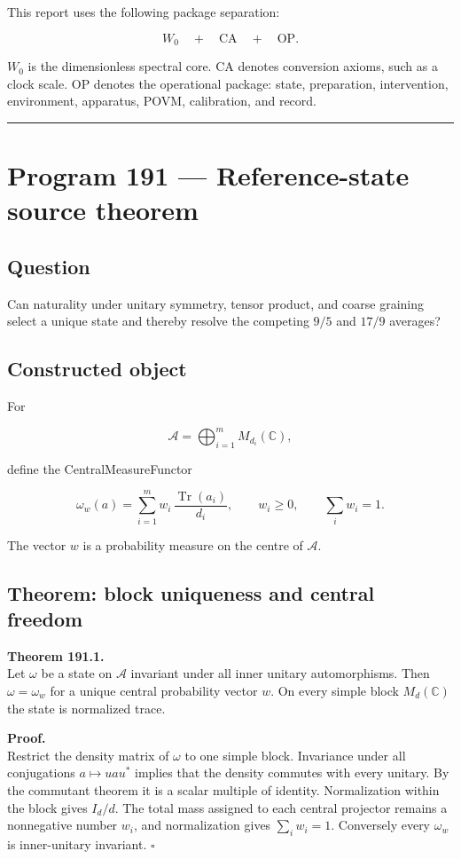 \documentclass[11pt,a4paper,openany]{report}
\begin{document}
This report uses the following package separation:

\[
W_0
\quad+\quad
\mathrm{CA}
\quad+\quad
\mathrm{OP}.
\]

\(W_0\) is the dimensionless spectral core. CA denotes conversion axioms, such as a clock scale. OP denotes the operational package: state, preparation, intervention, environment, apparatus, POVM, calibration, and record.

\par\medskip\hrule\medskip

\chapter{Program 191 --- Reference-state source theorem}

\section{Question}

Can naturality under unitary symmetry, tensor product, and coarse graining select a unique state and thereby resolve the competing \(9/5\) and \(17/9\) averages?

\section{Constructed object}

For

\[
\mathcal A=\bigoplus_{i=1}^m M_{d_i}(\mathbb C),
\]

define the CentralMeasureFunctor

\[
\omega_w(a)
=
\sum_{i=1}^m
w_i\,\frac{\operatorname{Tr}(a_i)}{d_i},
\qquad
w_i\ge0,
\qquad
\sum_iw_i=1.
\]

The vector \(w\) is a probability measure on the centre of \(\mathcal A\).

\section{Theorem: block uniqueness and central freedom}

\textbf{Theorem 191.1.}\\
Let \(\omega\) be a state on \(\mathcal A\) invariant under all inner unitary automorphisms. Then \(\omega=\omega_w\) for a unique central probability vector \(w\). On every simple block \(M_d(\mathbb C)\) the state is normalized trace.

\textbf{Proof.}\\
Restrict the density matrix of \(\omega\) to one simple block. Invariance under all conjugations \(a\mapsto uau^\ast\) implies that the density commutes with every unitary. By the commutant theorem it is a scalar multiple of identity. Normalization within the block gives \(I_d/d\). The total mass assigned to each central projector remains a nonnegative number \(w_i\), and normalization gives \(\sum_iw_i=1\). Conversely every \(\omega_w\) is inner-unitary invariant. \(\square\)
\end{document}
